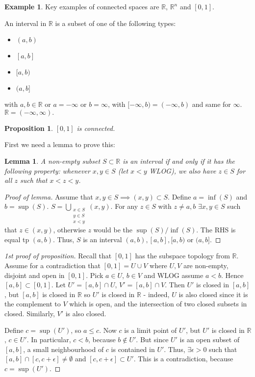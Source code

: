 \documentclass{article}
\theoremstyle{definition}
\newtheorem{exmp}{Example}[section]
\theoremstyle{plain}%
\newtheorem{lem}[thm]{Lemma}
\newtheorem{prop}[thm]{Proposition}
\theoremstyle{remark}
\newcommand{\union}{\cup}
\newcommand{\Union}{\bigcup}
\newcommand{\intersection}{\cap}
\newcommand{\R}{\mathbb{R}}
\begin{document}
\begin{exmp}
    Key examples of connected spaces are $\R$, $\R^n$ and $[0,1]$.
\end{exmp}

An interval in $\R$ is a subset of one of the following types:
\begin{itemize}
    \item $(a,b)$
    \item $[a,b]$
    \item $[a,b)$
    \item $(a,b]$
\end{itemize}
with $a,b \in \R$ or $a = -\infty$ or $b = \infty$, with $[-\infty, b) = (-\infty, b)$ and same for $\infty$. $\R = (-\infty, \infty).$

\begin{prop}
    $[0,1]$ is connected.
\end{prop}

First we need a lemma to prove this:

\begin{lem}\label{Interval definition lemma}
    A non-empty subset $S \subset \R$ is an interval if and only if it has the following property: whenever $x,y \in S$ (let $x < y$ WLOG), we also have $z \in S$ for all $z$ such that $x < z < y$.
\end{lem}

\begin{proof}[Proof of lemma]
    Assume that $x,y \in S \implies (x,y) \subset S$. Define $a = \inf(S)$ and $b = \sup(S)$. $S = \Union_{\substack{x \in S \\ y \in S \\ x < y}} (x,y)$. For any $z \in S$ with $z \ne a, b$ $\exists x,y \in S$ such that $z \in (x,y)$, otherwise $z$ would be the $\sup(S)/\inf(S)$. The RHS is equal tp $(a,b)$. Thus, $S$ is an interval $(a,b), [a,b], [a,b)$ or $(a,b]$.
\end{proof}

\begin{proof}[1st proof of proposition]
    Recall that $[0,1]$ has the subspace topology from $\R$. Assume for a contradiction that $[0,1] = U \union V$ where $U,V$ are non-empty, disjoint and open in $[0,1]$. Pick $a \in U$, $b \in V$ and WLOG assume $a < b$. Hence $[a,b] \subset [0,1]$. Let $U' = [a,b] \intersection U$, $V' = [a,b] \intersection V$. Then $U'$ is closed in $[a,b]$, but $[a,b]$ is closed in $\R$ so $U'$ is closed in $\R$ - indeed, $U$ is also closed since it is the complement to $V$ which is open, and the intersection of two closed subsets in closed. Similarly, $V'$ is also closed.
    
    Define $c = \sup(U')$, so $a \le c$. Now $c$ is a limit point of $U'$, but $U'$ is closed in $\R$, $c \in U'$. In particular, $c < b$, because $b \not\in U'$. But since $U'$ is an open subset of $[a,b]$, a small neighbourhood of $c$ is contained in $U'$. Thus, $\exists \epsilon > 0$ such that $[a,b] \intersection [c,c+\epsilon] \ne \emptyset$ and $[c, c+ \epsilon] \subset U'$. This is a contradiction, because $c = \sup(U')$.
\end{proof}
\end{document}
